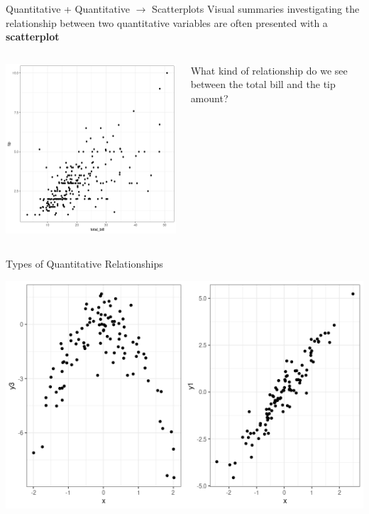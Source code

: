 \documentclass{beamer}
\begin{document}
\begin{frame}{Quantitative + Quantitative $\rightarrow$ Scatterplots}
Visual summaries investigating the relationship between two quantitative variables are often presented with a \textbf{scatterplot} \vspace{2mm}
\begin{columns}
  \begin{column}{0.5\textwidth}
  \includegraphics[scale=0.35]{img/scatter_tip.png}
  \end{column}
  \begin{column}{0.4\textwidth}
  What kind of relationship do we see between the total bill and the tip amount?
  \end{column}
\end{columns}
\end{frame}


\begin{frame}{Types of Quantitative Relationships}
\begin{center}
\includegraphics[scale=0.5]{img/linear_nonlinear.png}
\end{center}
\end{frame}
\end{document}
